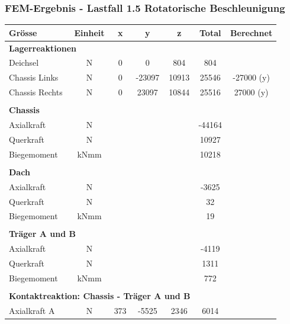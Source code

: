 

  \subsubsection{FEM-Ergebnis - Lastfall 1.5 Rotatorische Beschleunigung}
  \begin{table}[H]
  \centering
  \begin{tabular}{lcccccc}
  Grösse	&	Einheit	&	x	&	y	&	z	&	Total	&	Berechnet	\\	\hline
  \multicolumn{5}{l}{\textbf{Lagerreaktionen}}									&		&		\\	\thickhline
  Deichsel	&	N	&	0	&	0	&	804	&	804	&		\\
  Chassis Links	&	N	&	0	&	-23097	&	10913	&	25546	&	-27000 (y)	\footnotemark \\
  Chassis Rechts	&	N	&	0	&	23097	&	10844	&	25516	&	27000 (y)	\\	\hline	\\
  \multicolumn{5}{l}{\textbf{Chassis}}									&		&		\\	\thickhline
  Axialkraft	&	N	&		&		&		&	-44164	&		\\
  Querkraft	&	N	&		&		&		&	10927	&		\\
  Biegemoment	&	kNmm	&		&		&		&	10218	&		\\	\hline	\\
  \multicolumn{5}{l}{\textbf{Dach}}									&		&		\\	\thickhline
  Axialkraft	&	N	&		&		&		&	-3625	&		\\
  Querkraft	&	N	&		&		&		&	32	&		\\
  Biegemoment	&	kNmm	&		&		&		&	19	&		\\	\hline	\\
  \multicolumn{5}{l}{\textbf{Träger A und B}}													\\	\thickhline
  Axialkraft	&	N	&		&		&		&	-4119	&		\\
  Querkraft	&	N	&		&		&		&	1311	&		\\
  Biegemoment	&	kNmm	&		&		&		&	772	&		\\	\hline	\\
  \multicolumn{5}{l}{\textbf{Kontaktreaktion: Chassis - Träger A und B}}									&		&		\\	\thickhline
   Axialkraft A	&	N	&	373	&	-5525	&	2346	&	6014	&		\\

\end{tabular}
\end{table}
